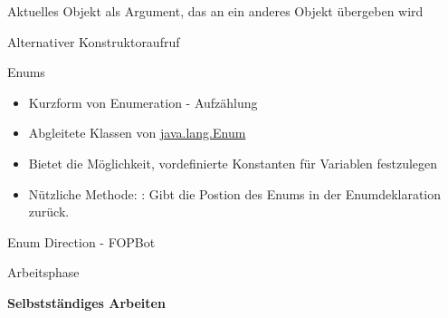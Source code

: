 \documentclass{../tuda-beamer}
\begin{document}
  \begin{frame}{Aktuelles Objekt als Argument, das an ein anderes Objekt übergeben wird}
    
  \end{frame}

  \begin{frame}[c]{Alternativer Konstruktoraufruf}
    
  \end{frame}

  \begin{frame}{Enums}
    \begin{itemize}
      \item Kurzform von Enumeration - Aufzählung
      \item Abgleitete Klassen von \href{https://docs.oracle.com/en/java/javase/11/docs/api/java
.base/java/lang/Enum.html}{java.lang.Enum}
      \item Bietet die Möglichkeit, vordefinierte Konstanten für Variablen festzulegen
      \item Nützliche Methode: : Gibt die Postion des Enums in der
      Enumdeklaration zurück.
    \end{itemize}
  \end{frame}

  \begin{frame}{Enum Direction - FOPBot}
    
  \end{frame}

  \begin{frame}[c]{Arbeitsphase}
    \begin{center}
      \textbf{\LARGE Selbstständiges Arbeiten}
    \end{center}
  \end{frame}
\end{document}
